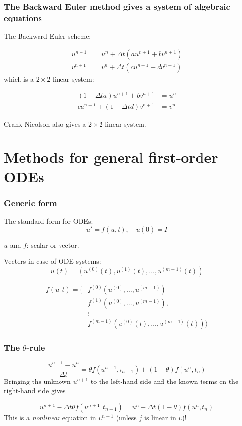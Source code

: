\documentclass{beamer}
\begin{document}
\begin{frame}
\frametitle{The Backward Euler method gives a system of algebraic equations}

The Backward Euler scheme:

\begin{align}
u^{n+1} &= u^n + \Delta t (a u^{n+1} + b v^{n+1})\\ 
v^{n+1} &= v^n + \Delta t (c u^{n+1} + d v^{n+1})
\end{align}
which is a $2\times 2$ linear system:

\begin{align}
(1 - \Delta t a)u^{n+1} + bv^{n+1} &= u^n \\ 
c u^{n+1} + (1 - \Delta t d) v^{n+1} &= v^n
\end{align}

Crank-Nicolson also gives a $2\times 2$ linear system.
\end{frame}

\section{Methods for general first-order ODEs}
\label{decay:1stODEs}

\begin{frame}
\frametitle{Generic form}

The standard form for ODEs:
\begin{equation}
u' = f(u,t),\quad u(0)=I
\label{decay:ode:general}
\end{equation}

$u$ and $f$: scalar or vector.

Vectors in case of ODE systems:
\[ u(t) = (u^{(0)}(t),u^{(1)}(t),\ldots,u^{(m-1)}(t))   \]

\begin{align*}
f(u, t) = ( & f^{(0)}(u^{(0)},\ldots,u^{(m-1)})\\ 
            & f^{(1)}(u^{(0)},\ldots,u^{(m-1)}),\\ 
            & \vdots\\ 
            & f^{(m-1)}(u^{(0)}(t),\ldots,u^{(m-1)}(t)))
\end{align*}
\end{frame}

\begin{frame}
\frametitle{The $\theta$-rule}

\begin{equation}
\frac{u^{n+1}-u^n}{\Delta t} = \theta f(u^{n+1},t_{n+1}) +
(1-\theta)f(u^n, t_n)
\label{decay:fd2:theta}
\end{equation}
Bringing the unknown $u^{n+1}$ to the left-hand side and the known terms
on the right-hand side gives

   

\begin{equation}
u^{n+1} - \Delta t \theta f(u^{n+1},t_{n+1}) =
u^n + \Delta t(1-\theta)f(u^n, t_n)
\end{equation}
This is a \emph{nonlinear} equation in $u^{n+1}$ (unless $f$ is linear in $u$)!
\end{frame}
\end{document}
